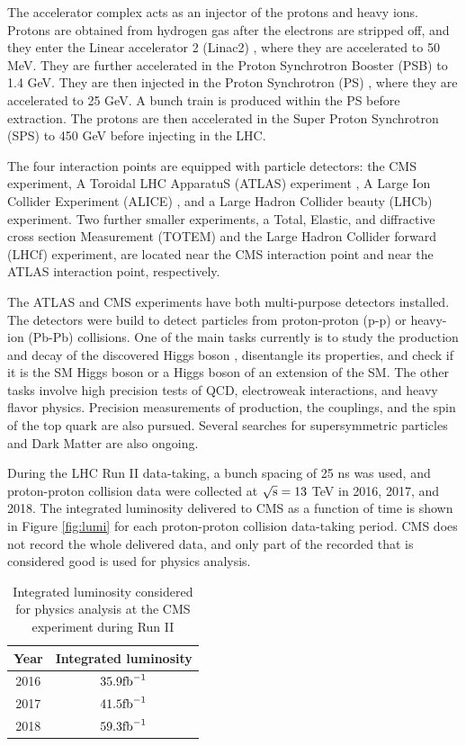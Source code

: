 The accelerator complex acts as an injector of the protons and heavy ions. Protons are obtained from hydrogen gas after the electrons are stripped off, and they enter the Linear accelerator 2 (Linac2) \cite{accelerator:1997427}, where they are accelerated to 50 MeV. They are further accelerated in the Proton Synchrotron Booster (PSB) \cite{Synchrotron:1997372} to 1.4 GeV. They are then injected in the Proton Synchrotron (PS) \cite{Synchrotron:1997189}, where they are accelerated to 25 GeV. A bunch train is produced within the PS before extraction. The protons are then accelerated in the Super Proton Synchrotron (SPS) \cite{Synchrotron:1997188} to 450 GeV before injecting in the LHC.

The four interaction points are equipped with particle detectors: the CMS experiment, A Toroidal LHC ApparatuS (ATLAS) experiment \cite{Aad:2008zzm}, A Large Ion Collider Experiment (ALICE) \cite{Aamodt:2008zz}, and a Large Hadron Collider beauty (LHCb) \cite{Alves:2008zz} experiment. Two further smaller experiments, a Total, Elastic, and diffractive cross section Measurement (TOTEM) \cite{Anelli:2008zza} and the Large Hadron Collider forward (LHCf) \cite{Adriani:2008zz} experiment, are located near the CMS interaction point and near the ATLAS interaction point, respectively.

The ATLAS and CMS experiments have both multi-purpose detectors installed. The detectors were build to detect particles from proton-proton (p-p) or heavy-ion (Pb-Pb) collisions. One of the main tasks currently is to study the production and decay of the discovered Higgs boson \cite{Chatrchyan:2013lba}, disentangle its properties, and check if it is the SM Higgs boson or a Higgs boson of an extension of the SM. The other tasks involve high precision tests of QCD, electroweak interactions, and heavy flavor physics. Precision measurements of production, the couplings, and the spin of the top quark are also pursued. Several searches for supersymmetric particles and Dark Matter are also ongoing.

During the LHC Run II data-taking, a bunch spacing of 25 ns was used, and proton-proton collision data were collected at $\sqrt{\text{s}} = 13$ TeV in 2016, 2017, and 2018. The integrated luminosity delivered to CMS as a function of time is shown in Figure \ref{fig:lumi} for each proton-proton collision data-taking period. CMS does not record the whole delivered data, and only part of the recorded that is considered good is used for physics analysis.

\begin{table}[!hbpt]
  \centering
  \caption{Integrated luminosity considered for physics analysis at the CMS experiment during Run II}
  \begin{tabular}{|c|c|}
    \hline Year & Integrated luminosity \\
    \hline 2016 & $35.9 \text{fb}^{-1}$ \\
    \hline 2017 & $41.5 \text{fb}^{-1}$ \\
    \hline 2018 & $59.3 \text{fb}^{-1}$ \\
    \hline
  \end{tabular}
  \label{tab:luminosity}
\end{table}


